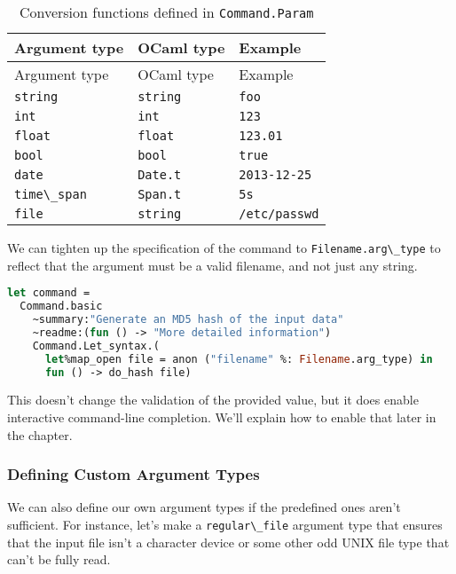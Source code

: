 \hypertarget{table14_1}{}
\begin{longtable}[]{@{}lll@{}}
\caption{Conversion functions defined in
\passthrough{\lstinline!Command.Param!}}\tabularnewline
\toprule
Argument type & OCaml type & Example\tabularnewline
\midrule
\endfirsthead
\toprule
Argument type & OCaml type & Example\tabularnewline
\midrule
\endhead
\passthrough{\lstinline!string!} & \passthrough{\lstinline!string!} &
\passthrough{\lstinline!foo!}\tabularnewline
\passthrough{\lstinline!int!} & \passthrough{\lstinline!int!} &
\passthrough{\lstinline!123!}\tabularnewline
\passthrough{\lstinline!float!} & \passthrough{\lstinline!float!} &
\passthrough{\lstinline!123.01!}\tabularnewline
\passthrough{\lstinline!bool!} & \passthrough{\lstinline!bool!} &
\passthrough{\lstinline!true!}\tabularnewline
\passthrough{\lstinline!date!} & \passthrough{\lstinline!Date.t!} &
\passthrough{\lstinline!2013-12-25!}\tabularnewline
\passthrough{\lstinline!time\_span!} & \passthrough{\lstinline!Span.t!}
& \passthrough{\lstinline!5s!}\tabularnewline
\passthrough{\lstinline!file!} & \passthrough{\lstinline!string!} &
\passthrough{\lstinline!/etc/passwd!}\tabularnewline
\bottomrule
\end{longtable}

We can tighten up the specification of the command to
\passthrough{\lstinline!Filename.arg\_type!} to reflect that the
argument must be a valid filename, and not just any string.

\begin{lstlisting}[language=Caml]
let command =
  Command.basic
    ~summary:"Generate an MD5 hash of the input data"
    ~readme:(fun () -> "More detailed information")
    Command.Let_syntax.(
      let%map_open file = anon ("filename" %: Filename.arg_type) in
      fun () -> do_hash file)
\end{lstlisting}

This doesn't change the validation of the provided value, but it does
enable interactive command-line completion. We'll explain how to enable
that later in the chapter.

\hypertarget{defining-custom-argument-types}{%
\subsubsection{Defining Custom Argument
Types}\label{defining-custom-argument-types}}

We can also define our own argument types if the predefined ones aren't
sufficient. For instance, let's make a
\passthrough{\lstinline!regular\_file!} argument type that ensures that
the input file isn't a character device or some other odd UNIX file type
that can't be fully read. 

